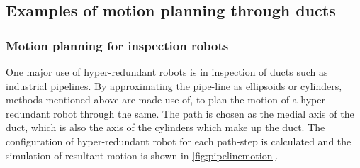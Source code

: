 \documentclass[12pt,a4]{article}
\begin{document}
\subsection{Examples of motion planning through ducts}

\subsubsection{Motion planning for inspection robots}
One major use of hyper-redundant robots is in inspection of ducts such as industrial pipelines. By approximating the pipe-line as ellipsoids or cylinders, methods mentioned above are made use of, to plan the motion of a hyper-redundant robot through the same. The path is chosen as the medial axis of the duct, which is also the axis of the cylinders which make up the duct. The configuration of hyper-redundant robot for each path-step is calculated and the simulation of resultant motion is shown in \cref{fig:pipelinemotion}.
\end{document}
